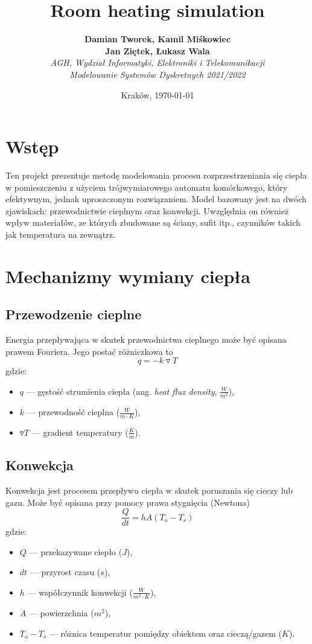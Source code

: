 \documentclass{article}
\title{Room heating simulation}
\author{\textbf{Damian Tworek, Kamil Miśkowiec} \\ \textbf{Jan Ziętek, Łukasz Wala}\\
    \textit{AGH, Wydział Informatyki, Elektroniki i Telekomunikacji} \\
    \textit{Modelowanie Systemów Dyskretnych 2021/2022}}
\date{Kraków, \today}
\begin{document}
\maketitle

\section{Wstęp}
Ten projekt prezentuje metodę modelowania procesu rozprzestrzeniania się ciepła w pomieszczeniu z użyciem
trójwymiarowego automatu komórkowego, który efektywnym, jednak uproszczonym rozwiązaniem. 
Model bazowany jest na dwóch zjawiskach: przewodnictwie cieplnym oraz konwekcji.
Uwzględnia on również wpływ materiałów, ze których zbudowane są ściany, sufit itp., czynników takich jak temperatura na
zewnątrz.

\section{Mechanizmy wymiany ciepła}
\subsection{Przewodzenie cieplne}
Energia przepływająca w skutek przewodnictwa cieplnego może być opisana prawem Fouriera. Jego postać różniczkowa to
$$q=-k\triangledown T$$
gdzie:
\begin{itemize}
    \item 
    $q$ --- gęstość strumienia ciepła (ang. \textit{heat flux density}, $\frac{W}{m^2}$),
    \item
    $k$ --- przewodność cieplna ($\frac{W}{m\cdot K}$),
    \item
    $\triangledown T$ --- gradient temperatury ($\frac{K}{m}$).
\end{itemize}

\subsection{Konwekcja}
Konwekcja jest procesem przepływu ciepła w skutek poruszania się cieczy lub gazu. Może być opisana przy pomocy
prawa stygnięcia (Newtona)
$$\frac{Q}{dt}=hA(T_o - T_s)$$
gdzie:
\begin{itemize}
    \item 
    $Q$ --- przekazywane ciepło ($J$),
    \item
    $dt$ --- przyrost czasu ($s$),
    \item
    $h$ --- współczynnik konwekcji ($\frac{W}{m^2 \cdot K}$),
    \item
    $A$ --- powierzchnia ($m^2$),
    \item
    $T_o - T_s$ --- różnica temperatur pomiędzy obiektem oraz cieczą/gazem ($K$).
\end{itemize}
\end{document}
